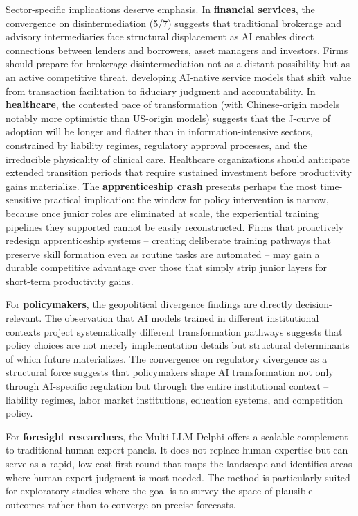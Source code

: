 \documentclass[preprint,review,12pt]{elsarticle}
\begin{document}
Sector-specific implications deserve emphasis. In \textbf{financial services}, the convergence on disintermediation (5/7) suggests that traditional brokerage and advisory intermediaries face structural displacement as AI enables direct connections between lenders and borrowers, asset managers and investors. Firms should prepare for brokerage disintermediation not as a distant possibility but as an active competitive threat, developing AI-native service models that shift value from transaction facilitation to fiduciary judgment and accountability. In \textbf{healthcare}, the contested pace of transformation (with Chinese-origin models notably more optimistic than US-origin models) suggests that the J-curve of adoption will be longer and flatter than in information-intensive sectors, constrained by liability regimes, regulatory approval processes, and the irreducible physicality of clinical care. Healthcare organizations should anticipate extended transition periods that require sustained investment before productivity gains materialize. The \textbf{apprenticeship crash} presents perhaps the most time-sensitive practical implication: the window for policy intervention is narrow, because once junior roles are eliminated at scale, the experiential training pipelines they supported cannot be easily reconstructed. Firms that proactively redesign apprenticeship systems -- creating deliberate training pathways that preserve skill formation even as routine tasks are automated -- may gain a durable competitive advantage over those that simply strip junior layers for short-term productivity gains.

For \textbf{policymakers}, the geopolitical divergence findings are directly decision-relevant. The observation that AI models trained in different institutional contexts project systematically different transformation pathways suggests that policy choices are not merely implementation details but structural determinants of which future materializes. The convergence on regulatory divergence as a structural force suggests that policymakers shape AI transformation not only through AI-specific regulation but through the entire institutional context -- liability regimes, labor market institutions, education systems, and competition policy.

For \textbf{foresight researchers}, the Multi-LLM Delphi offers a scalable complement to traditional human expert panels. It does not replace human expertise but can serve as a rapid, low-cost first round that maps the landscape and identifies areas where human expert judgment is most needed. The method is particularly suited for exploratory studies where the goal is to survey the space of plausible outcomes rather than to converge on precise forecasts.
\end{document}
